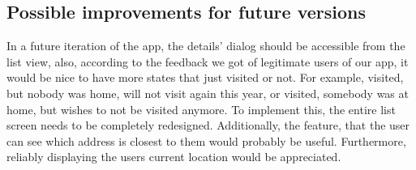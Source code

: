 \subsection{Possible improvements for future versions}

In a future iteration of the app, the details' dialog should be accessible from the list view, also, according to the feedback we got of legitimate users of our app, it would be nice to have more states that just visited or not. For example, visited, but nobody was home, will not visit again this year, or visited, somebody was at home, but wishes to not be visited anymore. To implement this, the entire list screen needs to be completely redesigned. Additionally, the feature, that the user can see which address is closest to them would probably be useful. Furthermore, reliably displaying the users current location would be appreciated.

\newpage
